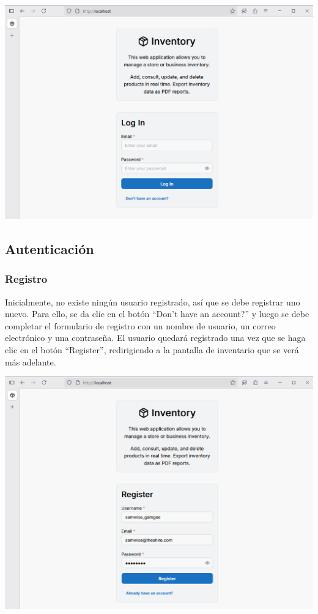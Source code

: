 \includegraphics[width=\textwidth]{images/1 Pantalla Inicial}

\subsection{Autenticación}

\subsubsection{Registro}

Inicialmente, no existe ningún usuario registrado, así que se debe registrar uno nuevo. Para ello, se da clic en el botón “Don't have an account?” y luego se debe completar el formulario de registro con un nombre de usuario, un correo electrónico y una contraseña. El usuario quedará registrado una vez que se haga clic en el botón “Register”, redirigiendo a la pantalla de inventario que se verá más adelante.

\includegraphics[width=\textwidth]{images/2 Registro}

